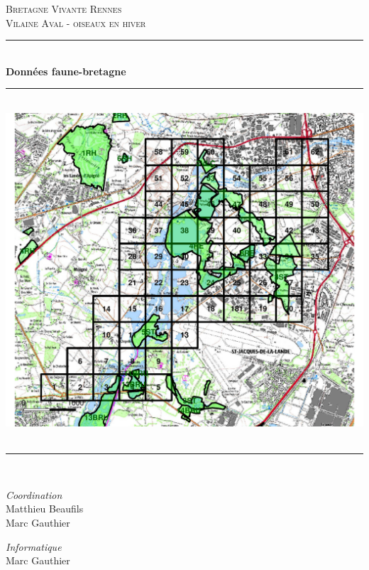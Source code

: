 \documentclass[a4paper,twoside,english]{article}
\newcommand{\HRule}{\rule{\linewidth}{0.5mm}}
\begin{document}
%
\begin{titlepage}
  \begin{sffamily}
  \begin{center}



    \textsc{\LARGE Bretagne Vivante Rennes}\\[1cm]
    \textsc{\Large Vilaine Aval - oiseaux en hiver}\\[1cm]

    \HRule \\[0.4cm]
    { \huge \bfseries Données faune-bretagne}
    \HRule \\[0.4cm]
    \includegraphics[width=190mm]{images/territoire_Nord.pdf}~\\[.5cm]
    \HRule \\[0.4cm]
    \begin{minipage}{0.4\textwidth}
      \begin{flushleft} \large
        \emph{Coordination}\\
        Matthieu Beaufils\\
         Marc Gauthier
      \end{flushleft}
    \end{minipage}
    \begin{minipage}{0.4\textwidth}
      \begin{flushright} \large
        \emph{Informatique}\\
        Marc Gauthier
      \end{flushright}
    \end{minipage}

    \vfill
  \end{center}
  \end{sffamily}
\end{titlepage}
\setlength{\parskip}{0pt} %
\setlength{\parindent}{0pt}
\twocolumn

\onecolumn
\end{document}
